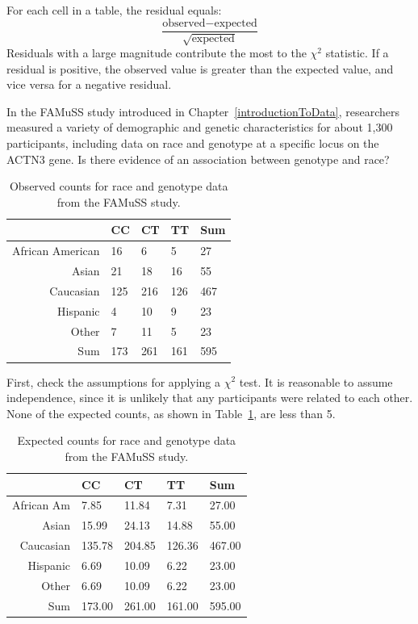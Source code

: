 For each cell in a table, the residual equals:
\[\dfrac{\text{observed} - \text{expected}}{\sqrt{\text{expected}}} \]
Residuals with a large magnitude contribute the most to the $\chi^2$ statistic. If a residual is positive, the observed value is greater than the expected value, and vice versa for a negative residual.

\begin{example}{In the FAMuSS study introduced in Chapter~\ref{introductionToData}, researchers measured a variety of demographic and genetic characteristics for about 1,300 participants, including data on race and genotype at a specific locus on the ACTN3 gene. Is there evidence of an association between genotype and race?
		\begin{table}[ht]
			\centering
			\begin{tabular}{r | l l l | l}
				\hline
				& CC & CT & TT & Sum \\ 
				\hline
				African American & 16 & 6 & 5 & 27 \\ 
				Asian & 21 & 18 & 16 & 55 \\ 
				Caucasian & 125 & 216 & 126 & 467 \\ 
				Hispanic & 4 & 10 & 9 & 23 \\ 
				Other & 7 & 11 & 5 & 23 \\ 
				\hline
				Sum & 173 & 261 & 161 & 595 \\ 
				\hline
			\end{tabular}
			\caption{Observed counts for race and genotype data from the FAMuSS study.}
		\end{table}
	}	
	
First, check the assumptions for applying a $\chi^2$ test. It is reasonable to assume independence, since it is unlikely that any participants were related to each other. None of the expected counts, as shown in Table~\ref{famussExpected}, are less than 5.

\begin{table}[ht]
	\centering
	\begin{tabular}{r| l l l | l}
		\hline
		& CC & CT & TT & Sum \\ 
		\hline
		African Am & 7.85 & 11.84 & 7.31 & 27.00 \\ 
		Asian & 15.99 & 24.13 & 14.88 & 55.00 \\ 
		Caucasian & 135.78 & 204.85 & 126.36 & 467.00 \\ 
		Hispanic & 6.69 & 10.09 & 6.22 & 23.00 \\ 
		Other & 6.69 & 10.09 & 6.22 & 23.00 \\ 
		\hline
		Sum & 173.00 & 261.00 & 161.00 & 595.00 \\ 
		\hline
	\end{tabular}
	\caption{Expected counts for race and genotype data from the FAMuSS study.}
	\label{famussExpected}
\end{table}


\end{example}
